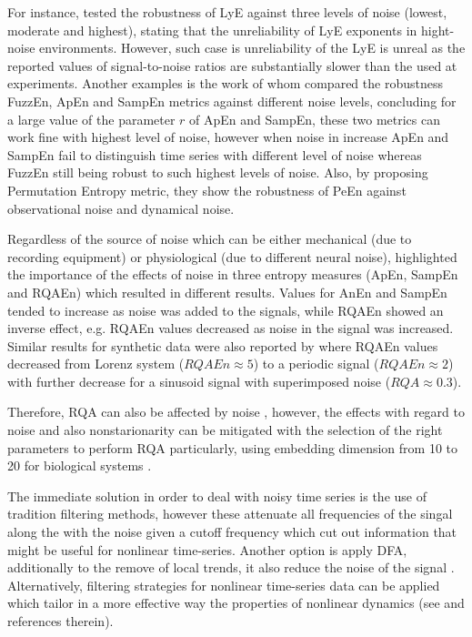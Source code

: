 For instance, \cite{rosenstein1993} tested the robustness of LyE against 
three levels of noise (lowest, moderate and highest), stating that 
the unreliability of LyE exponents  in hight-noise environments.
However, such case is unreliability of the LyE is unreal
as the reported values of signal-to-noise ratios are substantially 
slower than the used at \cite{rosenstein1993} experiments.
Another examples is the work of \cite{chen2009} whom compared 
the robustness FuzzEn, ApEn and SampEn metrics against different 
noise levels, concluding 
for a large value of the parameter $r$ of ApEn and SampEn, these
two metrics can work fine with highest level of noise, however
when noise in increase ApEn and SampEn fail to distinguish time
series with different level of noise whereas FuzzEn still being
robust to such highest levels of noise.
Also, \cite{bandt2002} by proposing Permutation Entropy metric,
they show the robustness of PeEn against observational noise and 
dynamical noise.

Regardless of the source of noise which can be either mechanical (due to recording equipment) or 
physiological (due to different neural noise), \cite{rhea2011} highlighted 
the importance of the effects of noise in three entropy measures (ApEn, SampEn and RQAEn)
which resulted in different results.
Values for AnEn and SampEn tended to increase as noise was added to the signals,
while RQAEn  showed an inverse effect, e.g. RQAEn values decreased 
as noise in the signal was increased.
Similar results for synthetic data were also reported by \cite{pellecchia2005} 
where RQAEn values decreased from Lorenz system ($RQAEn \approx 5$) to a periodic signal ($RQAEn \approx 2$)
with further decrease for a sinusoid signal with superimposed noise ($RQA \approx 0.3$).

Therefore, RQA can also be affected by noise \cite{rhea2011}, 
however, the effects with regard to noise and also nonstarionarity
can be mitigated with the selection of the right parameters to perform RQA 
particularly, using embedding dimension from 10 to 20 for biological systems \cite{webber2005}.

The immediate solution in order to deal with noisy time series is the use of 
tradition filtering methods, however these attenuate all frequencies of the singal 
along the with the noise given a cutoff frequency which cut out information that might
be useful for nonlinear time-series. Another option is apply DFA, additionally to 
the remove of local trends, it also reduce the noise of the signal \citep{hausdorff1995}.
Alternatively, filtering strategies for nonlinear time-series data can be applied 
which tailor in a more effective way the properties of nonlinear dynamics
(see \citealt*{bradley2015} and references therein).


%







